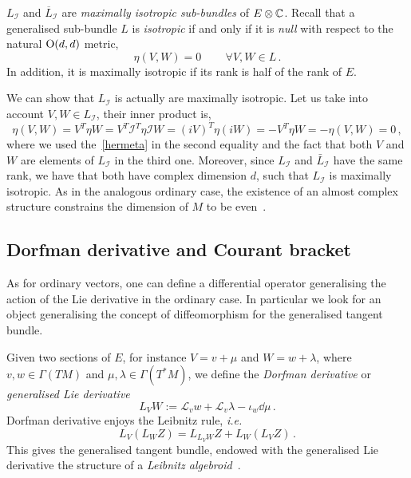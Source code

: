 \documentclass[debug]{phd}
\begin{document}
						$L_\mathcal{I}$ and $\overline{L}_\mathcal{I}$ are \emph{maximally isotropic sub-bundles} of $E\otimes \mathbb{C}$.
						Recall that a generalised sub-bundle $L$ is \emph{isotropic} if and only if it is \emph{null} with respect to the natural $\mathrm{O}(d,d)$ metric,
								\begin{equation}
									\eta(V,W) = 0 \, \qquad \forall V, W \in L \, .
								\end{equation}
						In addition, it is maximally isotropic if its rank is half of the rank of $E$.
						
						We can show that $L_\mathcal{I}$ is actually are maximally isotropic.
						Let us take into account $V, W \in L_\mathcal{I}$, their inner product is,
								\begin{equation*}
									\eta(V,W) = V^T \eta W = V^T \mathcal{I}^T \eta \mathcal{I} W = (i V)^T \eta (iW) = - V^T \eta W = - \eta (V,W) = 0 \, ,
								\end{equation*}
						where we used the~\eqref{hermeta} in the second equality and the fact that both $V$ and $W$ are elements of $L_{\mathcal{I}}$ in the third one.
						Moreover, since $L_\mathcal{I}$ and $\bar{L}_\mathcal{I}$ have the same rank, we have that both have complex dimension $d$, such that $L_\mathcal{I}$ is maximally isotropic.
						As in the analogous ordinary case, the existence of an almost complex structure constrains the dimension of $M$ to be even~\cite{gualtphd}.
			\subsection{Dorfman derivative and Courant bracket}
					As for ordinary vectors, one can define a differential operator generalising the action of the Lie derivative in the ordinary case.
					In particular we look for an object generalising the concept of diffeomorphism for the generalised tangent bundle.
					
					Given two sections of $E$, for instance $V = v + \mu$ and $W = w + \lambda$, where $v, w \in \Gamma(TM)$ and $\mu, \lambda \in \Gamma(T^*M)$, we define the \emph{Dorfman derivative} or \emph{generalised Lie derivative}~\cite{hitch1, waldram5, waldram1}
							\begin{equation}\label{dorf}
								L_{V} W := \mathcal{L}_v w + \mathcal{L}_v \lambda - \iota_w \dd \mu \, .
							\end{equation}
					Dorfman derivative enjoys the Leibnitz rule, \emph{i.e.}
							\begin{equation}\label{eq:Leibniz}
								L_V (L_W Z) = L_{L_V W} Z + L_W (L_V Z) \, .
							\end{equation}
					This gives the generalised tangent bundle, endowed with the generalised Lie derivative the structure of a \emph{Leibnitz algebroid}~\cite{baragliaLeib}.
					
\end{document}
